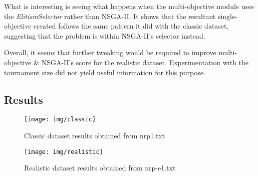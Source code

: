\documentclass[11pt, a4paper]{article}
\begin{document}
What is interesting is seeing what happens when the multi-objective module uses
the \emph{ElitismSelector} rather than NSGA-II. It shows that the resultant
single-objective created follows the same pattern it did with the classic
dataset, suggesting that the problem is within NSGA-II's selector instead.

Overall, it seems that further tweaking would be required to improve
multi-objective \& NSGA-II's score for the realistic dataset. Experimentation
with the tournament size did not yield useful information for this purpose.

\newpage
\subsection{Results} %
\label{sub:results}
\begin{figure}[H]
    \centering
    \texttt{[image: img/classic]}
    \caption{Classic dataset results obtained from nrp1.txt}
    \label{fig:classic}
\end{figure}

\begin{figure}[H]
    \centering
    \texttt{[image: img/realistic]}
    \caption{Realistic dataset results obtained from nrp-e1.txt}
    \label{fig:realistic}
\end{figure}

% 
%  
\end{document}
